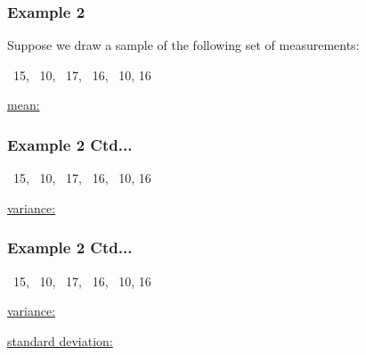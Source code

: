 \documentclass[xcolor=svgnames, compress]{beamer}
\begin{document}

\begin{frame}[t]
\frametitle{Example 2} 

\vspace{-0.25cm}

Suppose we draw a sample of the following set of measurements:
\begin{center}
~15, ~10, ~17, ~16, ~10, 16
\end{center}

\underline{mean:}


\end{frame}




\begin{frame}[t]
\frametitle{Example 2 Ctd...} 

\vspace{-0.50cm}

\begin{center}
~15, ~10, ~17, ~16, ~10, 16
\end{center}

\vspace{-0.5cm}
\underline{variance:}


\end{frame}




\begin{frame}[t]
\frametitle{Example 2 Ctd...} 

\vspace{-0.50cm}

\begin{center}
~15, ~10, ~17, ~16, ~10, 16
\end{center}

\vspace{-0.5cm}
\underline{variance:}

\vspace{5.40cm}

\underline{standard deviation:}


\end{frame}
\end{document}

